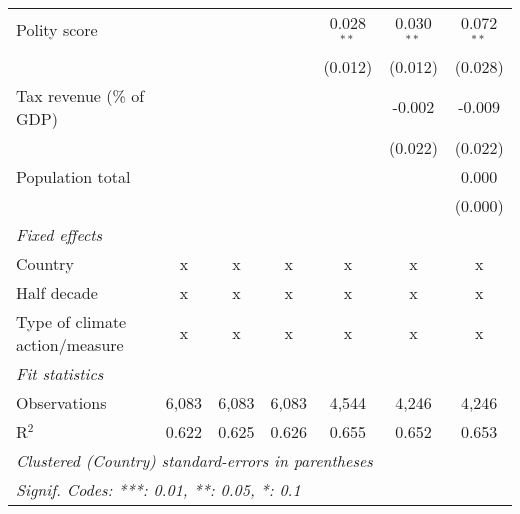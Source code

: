 \begin{tabular}{lcccccc}
   Polity score                                                     &         &               &                & 0.028$^{**}$   & 0.030$^{**}$   & 0.072$^{**}$\\   
                                                                    &         &               &                & (0.012)        & (0.012)        & (0.028)\\   
   Tax revenue (\% of GDP)                                          &         &               &                &                & -0.002         & -0.009\\   
                                                                    &         &               &                &                & (0.022)        & (0.022)\\   
   Population total                                                 &         &               &                &                &                & 0.000\\   
                                                                    &         &               &                &                &                & (0.000)\\   
   \emph{Fixed effects}\\
   Country                                                          & x       & x             & x              & x              & x              & x\\  
   Half decade                                                      & x       & x             & x              & x              & x              & x\\  
   Type of climate action/measure                                   & x       & x             & x              & x              & x              & x\\  
   \midrule \emph{Fit statistics}\\
   Observations                                                     & 6,083   & 6,083         & 6,083          & 4,544          & 4,246          & 4,246\\  
   R$^2$                                                            & 0.622   & 0.625         & 0.626          & 0.655          & 0.652          & 0.653\\  
   \midrule
   \multicolumn{7}{l}{\emph{Clustered (Country) standard-errors in parentheses}}\\
   \multicolumn{7}{l}{\emph{Signif. Codes: ***: 0.01, **: 0.05, *: 0.1}}\\
\end{tabular}
\par\endgroup


